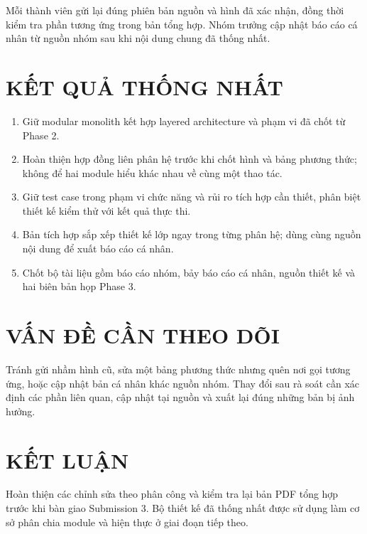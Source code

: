 \documentclass[10pt,a4paper]{article}
\begin{document}
Mỗi thành viên gửi lại đúng phiên bản nguồn và hình đã xác nhận, đồng thời kiểm tra phần tương ứng trong bản tổng hợp. Nhóm trưởng cập nhật báo cáo cá nhân từ nguồn nhóm sau khi nội dung chung đã thống nhất.

\section{KẾT QUẢ THỐNG NHẤT}
\begin{enumerate}
\item Giữ modular monolith kết hợp layered architecture và phạm vi đã chốt từ Phase 2.
\item Hoàn thiện hợp đồng liên phân hệ trước khi chốt hình và bảng phương thức; không để hai module hiểu khác nhau về cùng một thao tác.
\item Giữ test case trong phạm vi chức năng và rủi ro tích hợp cần thiết, phân biệt thiết kế kiểm thử với kết quả thực thi.
\item Bản tích hợp sắp xếp thiết kế lớp ngay trong từng phân hệ; dùng cùng nguồn nội dung để xuất báo cáo cá nhân.
\item Chốt bộ tài liệu gồm báo cáo nhóm, bảy báo cáo cá nhân, nguồn thiết kế và hai biên bản họp Phase 3.
\end{enumerate}

\section{VẤN ĐỀ CẦN THEO DÕI}
Tránh gửi nhầm hình cũ, sửa một bảng phương thức nhưng quên nơi gọi tương ứng, hoặc cập nhật bản cá nhân khác nguồn nhóm. Thay đổi sau rà soát cần xác định các phần liên quan, cập nhật tại nguồn và xuất lại đúng những bản bị ảnh hưởng.

\section{KẾT LUẬN}
Hoàn thiện các chỉnh sửa theo phân công và kiểm tra lại bản PDF tổng hợp trước khi bàn giao Submission 3. Bộ thiết kế đã thống nhất được sử dụng làm cơ sở phân chia module và hiện thực ở giai đoạn tiếp theo.
\end{document}
